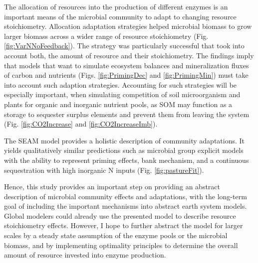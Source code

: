 \conclusions  
 
The allocation of resources into the production of different enzymes is an
important means of the microbial community to adapt to changing resource
stoichiometry. Allocation adaptation strategies helped microbial biomass to grow
larger biomass across a wider range of resource stoichiometry (Fig.
\ref{fig:VarNNoFeedback}). The strategy was particularly successful that took
into account both, the amount of resource and their stoichiometry.
The findings imply that models that want to simulate ecosystem balances and
mineralization fluxes of carbon and nutrients (Figs. \ref{fig:PrimingDec} and
\ref{fig:PrimingMin}) must take into account such adaption strategies.
Accounting for such strategies will be especially important, when simulating
competition of soil microorganism and plants for organic and inorganic nutrient
pools, as SOM may function as a storage to sequester surplus elements and
prevent them from leaving the system (Fig. \ref{fig:CO2Increase} and
\ref{fig:CO2IncreaseImb}).


The SEAM model provides a holistic description of community adaptations. It
yields qualitatively similar predictions such as microbial group explicit models
with the ability to represent priming effects, bank mechanism, and
a continuous sequestration with high inorganic N inputs (Fig. \ref{fig:pastureFit}).

Hence, this study provides an important step on providing an abstract
description of microbial community effects and adaptations, with the long-term
goal of including the important mechanisms into abstract earth system models.
Global modelers could already use the presented model to describe resource
stoichiometry effects. However, I hope to further abstract the model for larger
scales by a steady state assumption of the enzyme pools or the microbial
biomass, and by implementing optimality principles to determine the
overall amount of resource invested into enzyme production.


